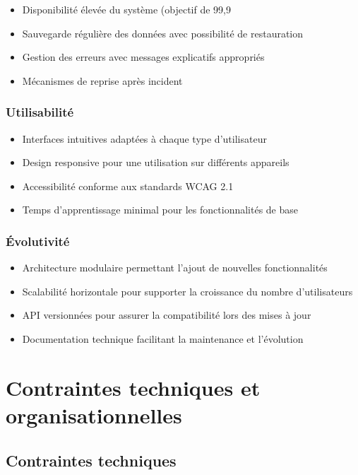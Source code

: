 \begin{itemize}
  \item Disponibilité élevée du système (objectif de 99,9%
  \item Sauvegarde régulière des données avec possibilité de restauration
  \item Gestion des erreurs avec messages explicatifs appropriés
  \item Mécanismes de reprise après incident
\end{itemize}

\subsubsection{Utilisabilité}

\begin{itemize}
  \item Interfaces intuitives adaptées à chaque type d'utilisateur
  \item Design responsive pour une utilisation sur différents appareils
  \item Accessibilité conforme aux standards WCAG 2.1
  \item Temps d'apprentissage minimal pour les fonctionnalités de base
\end{itemize}

\subsubsection{Évolutivité}

\begin{itemize}
  \item Architecture modulaire permettant l'ajout de nouvelles fonctionnalités
  \item Scalabilité horizontale pour supporter la croissance du nombre d'utilisateurs
  \item API versionnées pour assurer la compatibilité lors des mises à jour
  \item Documentation technique facilitant la maintenance et l'évolution
\end{itemize}

\section{Contraintes techniques et organisationnelles}

\subsection{Contraintes techniques}

